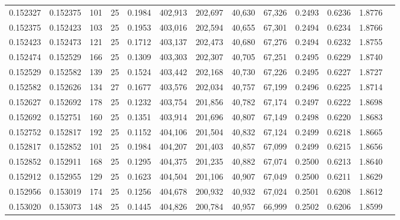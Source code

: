 \begin{tabular}{rrrrrrrrrrrrr}
0.152327 & 0.152375 &   101 &  25 &                                     0.1984 & 402,913 & 202,697 &  40,630 &  67,326 & 0.2493 & 0.6236 & 1.8776 \\
0.152375 & 0.152423 &   103 &  25 &                                     0.1953 & 403,016 & 202,594 &  40,655 &  67,301 & 0.2494 & 0.6234 & 1.8766 \\
0.152423 & 0.152473 &   121 &  25 &                                     0.1712 & 403,137 & 202,473 &  40,680 &  67,276 & 0.2494 & 0.6232 & 1.8755 \\
0.152474 & 0.152529 &   166 &  25 &                                     0.1309 & 403,303 & 202,307 &  40,705 &  67,251 & 0.2495 & 0.6229 & 1.8740 \\
0.152529 & 0.152582 &   139 &  25 &                                     0.1524 & 403,442 & 202,168 &  40,730 &  67,226 & 0.2495 & 0.6227 & 1.8727 \\
0.152582 & 0.152626 &   134 &  27 &                                     0.1677 & 403,576 & 202,034 &  40,757 &  67,199 & 0.2496 & 0.6225 & 1.8714 \\
0.152627 & 0.152692 &   178 &  25 &                                     0.1232 & 403,754 & 201,856 &  40,782 &  67,174 & 0.2497 & 0.6222 & 1.8698 \\
0.152692 & 0.152751 &   160 &  25 &                                     0.1351 & 403,914 & 201,696 &  40,807 &  67,149 & 0.2498 & 0.6220 & 1.8683 \\
0.152752 & 0.152817 &   192 &  25 &                                     0.1152 & 404,106 & 201,504 &  40,832 &  67,124 & 0.2499 & 0.6218 & 1.8665 \\
0.152817 & 0.152852 &   101 &  25 &                                     0.1984 & 404,207 & 201,403 &  40,857 &  67,099 & 0.2499 & 0.6215 & 1.8656 \\
0.152852 & 0.152911 &   168 &  25 &                                     0.1295 & 404,375 & 201,235 &  40,882 &  67,074 & 0.2500 & 0.6213 & 1.8640 \\
0.152912 & 0.152955 &   129 &  25 &                                     0.1623 & 404,504 & 201,106 &  40,907 &  67,049 & 0.2500 & 0.6211 & 1.8629 \\
0.152956 & 0.153019 &   174 &  25 &                                     0.1256 & 404,678 & 200,932 &  40,932 &  67,024 & 0.2501 & 0.6208 & 1.8612 \\
0.153020 & 0.153073 &   148 &  25 &                                     0.1445 & 404,826 & 200,784 &  40,957 &  66,999 & 0.2502 & 0.6206 & 1.8599 \\

\end{tabular}
